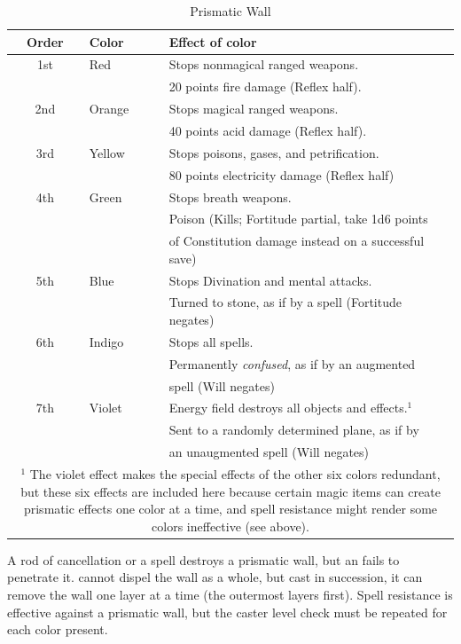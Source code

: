 \begin{table}
\caption{Prismatic Wall}
\label{tab:PrismaticWall}
\begin{center}
\begin{tabular}{|c|lp{8cm}|}
\hline
Order&Color&Effect of color\\
\hline
1st	&Red	&Stops nonmagical ranged weapons.\\
	&	&20 points fire damage (Reflex half).\\
2nd	&Orange	&Stops magical ranged weapons.\\
	&	&40 points acid damage (Reflex half).\\
3rd	&Yellow	&Stops poisons, gases, and petrification.\\
	&	&80 points electricity damage (Reflex half)\\
4th	&Green	&Stops breath weapons.\\
	&	&Poison (Kills; Fortitude partial, take 1d6 points\\
	&	&of Constitution damage instead on a successful save)\\
5th	&Blue	&Stops Divination and mental attacks.\\
	&	&Turned to stone, as if by a \nameref{Spell:TransmuteFleshAndStone} spell (Fortitude negates)\\
6th	&Indigo	&Stops all spells.\\
	&	&Permanently \emph{confused}, as if by an augmented\\
	&	&\nameref{Spell:Confusion} spell (Will negates)\\
7th	&Violet	&Energy field destroys all objects and effects.$^1$\\
	&	&Sent to a randomly determined plane, as if by\\
	&	& an unaugmented \nameref{Spell:PlaneShift} spell (Will negates)\\
\hline
\multicolumn{3}{p{10cm}}{\small $^1$ The violet effect makes the special effects of the other six colors redundant, but these six effects are included here because certain magic items can create prismatic effects one color at a time, and spell resistance might render some colors ineffective (see above).}
\end{tabular}
\end{center}
\end{table}

A rod of cancellation or a  spell destroys a prismatic wall, 
but an  fails to penetrate it. 
 cannot dispel the wall as a whole, but cast in succession, it can remove the wall one layer at a time
(the outermost layers first).
Spell resistance is effective against a prismatic wall, but the caster level check must be repeated for each color present. 

